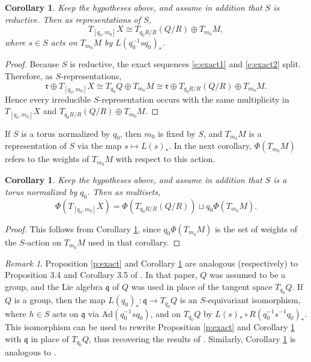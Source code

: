 \documentclass[11pt,letterpaper,reqno]{amsart}
\newcommand{\fq}{{\mathfrak q}}
\newcommand{\fr}{{\mathfrak r}}
\numberwithin{equation}{section}
\theoremstyle{plain}
\newtheorem{corollary}[theorem]{Corollary}
\theoremstyle{definition}
\theoremstyle{remark}
\newtheorem{remark}[theorem]{Remark}
\newcommand{\Ad}{\mathrm{Ad}}
\begin{document}
\begin{corollary} \label{c:tangent}
Keep the hypotheses above, and assume in addition that $S$ is reductive.
Then as representations of $S$, 
\begin{equation} \label{e:tangent}
T_{[q_0, m_0]} X \cong T_{q_0 R/R} (Q/R) \oplus T_{m_0} M,
\end{equation}
where $s \in S$ acts on $T_{m_0} M$ by $L(q_0^{-1} s q_0)_*$.
\end{corollary}

\begin{proof}
Because $S$ is reductive, the exact sequences \eqref{e:exact1} and \eqref{e:exact2} split.  Therefore, as $S$-representations,
$$
\fr \oplus T_{[q_0,m_0]} X \cong T_{q_0} Q \oplus T_{m_0} M \cong \fr \oplus T_{q_0 R/R} (Q/R) \oplus T_{m_0} M.
$$
Hence every irreducible $S$-representation
occurs with the same multiplicity in $T_{[q_0,m_0]} X$ and $T_{q_0 R/R} (Q/R) \oplus T_{m_0} M$.  
\end{proof}

If $S$ is a torus normalized by $q_0$,
then $m_0$ is fixed by $S$, and $T_{m_0} M$ is a representation of $S$ via the map $s \mapsto L(s)_*$.
In the next corollary, $\Phi(T_{m_0} M)$ refers to the weights of $T_{m_0}M$ with respect to this action.

\begin{corollary} \label{c:tangent2}
Keep the hypotheses above, and assume in addition that $S$ is a torus normalized by $q_0$.  Then as multisets,
$$
\Phi(T_{[q_0, m_0]} X) = \Phi(T_{q_0 R/R} (Q/R)) \sqcup  q_0 \Phi(T_{m_0} M).
$$
\end{corollary}

\begin{proof}
This follows from Corollary \ref{c:tangent}, since $q_0 \Phi(T_{m_0} M)$ is the set of weights of the $S$-action on $T_{m_0} M$ 
used in that corollary.
\end{proof}

\begin{remark} \label{r:GZ}
Proposition \ref{p:exact} and Corollary \ref{c:tangent} are analogous (respectively) to Proposition 3.4 and Corollary 3.5 of \cite{GZ}.
In that paper, $Q$ was assumed to be a group, and the Lie algebra $\fq$ of $Q$ was used in place of the tangent space $T_{q_0}Q$.
If $Q$ is a group, then the map $L(q_0)_*: \fq \to T_{q_0}Q$ is an $S$-equivariant isomorphism, where
$h \in S$ acts on $\fq$ via $\Ad(q_0^{-1} s q_0)$, and on $T_{q_0}Q$ by $L(s)_* \circ R(q_0^{-1} s^{-1} q_0)_*$.
This isomorphism can be used to rewrite Proposition \ref{p:exact} and Corollary \ref{c:tangent} with $\fq$ in place
of $T_{q_0}Q$, thus recovering the results of \cite{GZ}.  Similarly, Corollary \ref{c:tangent2} is analogous to \cite[Cor.~3.11]{GZ}.
\end{remark}
\end{document}
